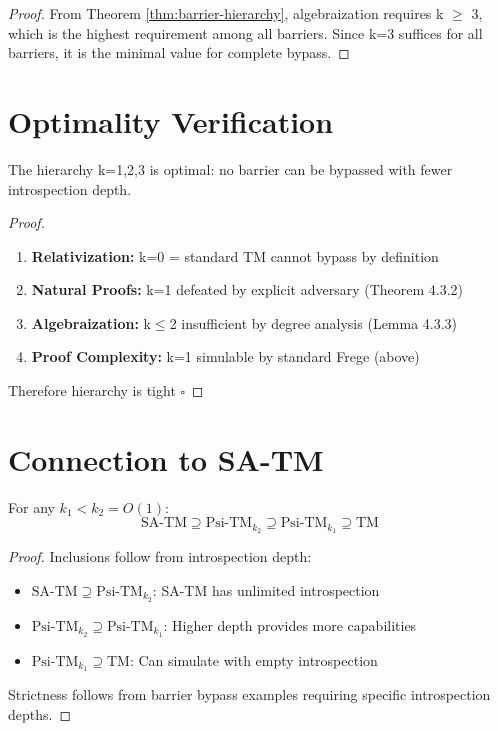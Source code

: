 \documentclass[11pt]{article}
\newcommand{\qed}{\hfill$\square$}
\begin{document}
\begin{proof}
From Theorem \ref{thm:barrier-hierarchy}, algebraization requires k $\geq$ 3, which is the highest requirement among all barriers. Since k=3 suffices for all barriers, it is the minimal value for complete bypass.
\end{proof}

\section{Optimality Verification}

\begin{theorem}
The hierarchy k=1,2,3 is optimal: no barrier can be bypassed with fewer introspection depth.
\end{theorem}

\begin{proof}
\begin{enumerate}
\item \textbf{Relativization:} k=0 = standard TM cannot bypass by definition
\item \textbf{Natural Proofs:} k=1 defeated by explicit adversary (Theorem 4.3.2)
\item \textbf{Algebraization:} k$\leq$2 insufficient by degree analysis (Lemma 4.3.3)
\item \textbf{Proof Complexity:} k=1 simulable by standard Frege (above)
\end{enumerate}
Therefore hierarchy is tight \qed
\end{proof}

\section{Connection to SA-TM}

\begin{theorem}
For any $k_1 < k_2 = O(1)$:
$$\text{SA-TM} \supseteq \text{Psi-TM}_{k_2} \supseteq \text{Psi-TM}_{k_1} \supseteq \text{TM}$$
\end{theorem}

\begin{proof}
Inclusions follow from introspection depth:
\begin{itemize}
\item $\text{SA-TM} \supseteq \text{Psi-TM}_{k_2}$: SA-TM has unlimited introspection
\item $\text{Psi-TM}_{k_2} \supseteq \text{Psi-TM}_{k_1}$: Higher depth provides more capabilities  
\item $\text{Psi-TM}_{k_1} \supseteq \text{TM}$: Can simulate with empty introspection
\end{itemize}
Strictness follows from barrier bypass examples requiring specific introspection depths.
\end{proof}
\end{document}
